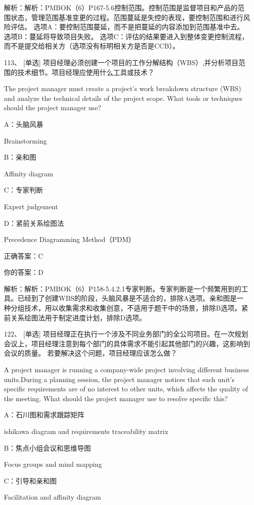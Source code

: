 解析：解析：PMBOK（6）P167-5.6控制范围。控制范围是监督项目和产品的范围状态，管理范围基准变更的过程。范围蔓延是失控的表现，要控制范围和进行风险评估。 选项A：要控制范围蔓延，而不是把蔓延的内容添加到范围基准中去。 选项B：蔓延将导致项目失败。 选项C：评估的结果要进入到整体变更控制流程，而不是提交给相关方（选项没有标明相关方是否是CCB）。


113、 [单选] 项目经理必须创建一个项目的工作分解结构（WBS）,并分析项目范围的技术细节。项目经理应使用什么工具或技术？

The project manager must create a project's work breakdown structure (WBS) and analyze the technical details of the project scope. What tools or techniques should the project manager use?

A：头脑风暴

Brainstorming

B：亲和图

Affinity diagram

C：专家判断

Expert judgement

D：紧前关系绘图法

Precedence Diagramming Method（PDM）

正确答案：C

你的答案：D

解析：解析：PMBOK（6）P158-5.4.2.1专家判断。专家判断是一个频繁用到的工具。已经到了创建WBS的阶段，头脑风暴是不适合的，排除A选项。亲和图是一种分组技术，用以收集需求和收集创意，不适用于题干中的场景，排除B选项。紧前关系绘图法用于制定进度计划，排除D选项。


122、 [单选] 项目经理正在执行一个涉及不同业务部门的全公司项目。在一次规划会议上，项目经理注意到每个部门的具体需求不能引起其他部门的兴趣，这影响到会议的质量。 若要解决这个问题，项目经理应该怎么做？

A project manager is running a company-wide project involving different business units.During a planning session, the project manager notices that each unit's specific requirements are of no interest to other units, which affects the quality of the meeting. What should the project manager use to resolve specific this?

A：石川图和需求跟踪矩阵

ishikawa diagram and requirements traceability matrix

B：焦点小组会议和思维导图

Focus groups and mind mapping

C：引导和亲和图

Facilitation and affinity diagram

